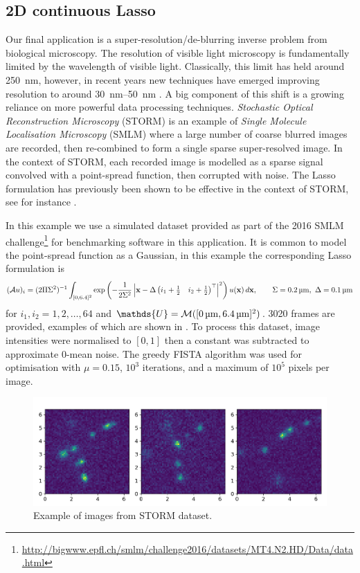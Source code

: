 \documentclass[10pt,a4paper,onecolumn]{article}
\numberwithin{equation}{section}
\let\F\mathds\let\C\mathcal\newcommand{\R}{\F{R}}\newcommand{\A}{\C{A}}
\renewcommand{\vec}{\mathbf}
\newcommand{\UCmath}[1]{%
	\begingroup
	\ucmathlist\uppercase\expandafter{#1}%
	\endgroup
}
\newcommand{\ucmathlist}{%
	\def\alpha{\mathrm{A}}%
	\def\beta{\mathrm{B}}%
	\let\gamma=\Gamma
	\let\delta=\Delta
	\def\epsilon{\mathrm{E}}%
	\def\varepsilon{\mathrm{E}}%
	\def\zeta{\mathrm{Z}}%
	\def\eta{\mathrm{H}}%
	\let\theta=\Theta
	\let\vartheta=\Theta
	\def\iota{\mathrm{I}}%
	\def\kappa{\mathrm{K}}%
	\let\lambda=\Lambda
	\def\mu{\mathrm{M}}%
	\def\nu{\mathrm{N}}%
	\let\xi=\Xi
	\let\pi=\Pi
	\let\varpi=\Pi
	\def\rho{\mathrm{P}}%
	\def\varrho{\mathrm{P}}%
	\let\sigma=\Sigma
	\def\tau{\mathrm{T}}%
	\let\upsilon=\Upsilon
	\let\phi=\Phi
	\let\varphi=\Phi
	\def\chi{\mathrm{X}}%
	\let\psi=\Psi
	\let\omega=\Omega
}
\newcommand{\caps}[1]{\UCmath{#1}}
\newcommand*{\varf}[1]{%
	\IfEqCase{#1}{%
		{0}{u}%
		{1}{v}%
		{2}{w}%
	}[u#1]%
}
\newcommand*{\spcf}[1]{%
	\IfEqCase{#1}{%
		{0}{\F{U}}%
		{1}{\F{V}}%
		{2}{\F{W}}%
	}[\F{U}#1]%
}
\newcommand*{\varx}[1]{%
	\IfEqCase{#1}{%
		{0}{x}%
		{1}{y}%
		{2}{z}%
		{3}{r}%
	}[x#1]%
}
\newcommand*{\Varx}[1]{\caps{\varx{#1}}}
\newcommand*{\vvarx}[1]{\vec{\varx{#1}}}\newcommand*{\vVarx}[1]{\vec{\Varx{#1}}}
\begin{document}
\subsection{2D continuous Lasso}
Our final application is a super-resolution/de-blurring inverse problem from biological microscopy. The resolution of visible light microscopy is fundamentally limited by the wavelength of visible light. Classically, this limit has held around \SI{250}{\nano\meter}, however, in recent years new techniques have emerged improving resolution to around \SIrange{30}{50}{\nano\meter} \citep{Schermelleh2019}. A big component of this shift is a growing reliance on more powerful data processing techniques. \emph{Stochastic Optical Reconstruction Microscopy} (STORM) is an example of \emph{Single Molecule Localisation Microscopy} (SMLM) where a large number of coarse blurred images are recorded, then re-combined to form a single sparse super-resolved image. In the context of STORM, each recorded image is modelled as a sparse signal convolved with a point-spread function, then corrupted with noise. The Lasso formulation has previously been shown to be effective in the context of STORM, see for instance \citet{Huang2017,Denoyelle2019}.

In this example we use a simulated dataset provided as part of the 2016 SMLM challenge\footnote{\url{http://bigwww.epfl.ch/smlm/challenge2016/datasets/MT4.N2.HD/Data/data.html}} for benchmarking software in this application. It is common to model the point-spread function as a Gaussian, in this example the corresponding Lasso formulation  is 
\begin{equation}
	(\A\varf0)_{i} = (2\pi\sigma^2)^{-1}\int_{[0,6.4]^2} \exp\left(-\frac{1}{2\sigma^2}\left|\vvarx0- \Delta\begin{pmatrix}i_1+\tfrac12 & i_2+\tfrac12\end{pmatrix}^\top \right|^2\right)\varf0(\vvarx0)\,d\vvarx0, \qquad \sigma=\SI{0.2}{\micro\meter},\ \Delta=\SI{0.1}{\micro\meter}
\end{equation}
for $i_1,i_2 = 1,2,\ldots,64$ and $\spcf0=\C M([\SI{0}{\micro\meter},\SI{6.4}{\micro\meter}]^2)$. 3020 frames are provided, examples of which are shown in . To process this dataset, image intensities were normalised to $[0,1]$ then a constant was subtracted to approximate 0-mean noise. The greedy FISTA algorithm was used for optimisation with $\mu=0.15$, $10^3$ iterations, and a maximum of $10^5$ pixels per image. 

\begin{figure}\centering
	\includegraphics[width=.8\textwidth]{STORM_data}
	\caption{Example of images from STORM dataset.}\label{fig: STORM data}
\end{figure}
\end{document}
